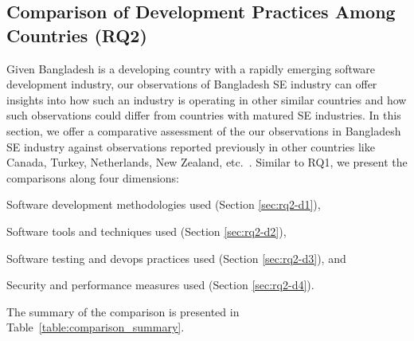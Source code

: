 \subsection{Comparison of Development Practices Among Countries (RQ2)}
\label{RQ2}
Given Bangladesh is a developing country with a rapidly emerging software development industry, our observations of Bangladesh SE industry can 
offer insights into how such an industry is operating in other similar countries and how such observations 
could differ from countries with matured SE industries. In this section, we offer a comparative assessment of the 
our observations in Bangladesh SE industry against observations reported previously in other countries like 
Canada, Turkey, Netherlands, New Zealand, etc.~\citep{Garousi2013, Garousi2015, Vonken2012, Wang2018}. 
Similar to RQ1, we present the comparisons along four dimensions: \begin{inparaenum}[D1.]
  \item Software development methodologies used (Section \ref{sec:rq2-d1}), 
  \item Software tools and techniques used (Section \ref{sec:rq2-d2}),
\item Software testing and devops practices used (Section \ref{sec:rq2-d3}), and
\item Security and performance measures used (Section \ref{sec:rq2-d4}). 
\end{inparaenum}
The summary of the comparison is presented in Table~\ref{table:comparison_summary}.
%   
% 
% 




% 





% 
% 
